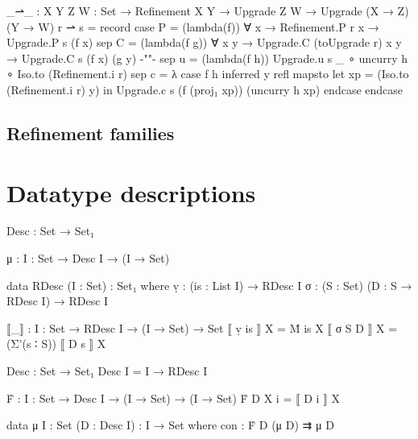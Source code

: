 \begin{code}
_⇀_ :  {X Y Z W : Set} →
       Refinement X Y → Upgrade Z W → Upgrade (X → Z) (Y → W)
r ⇀ s = record
  case   P  =  (lambda(f)) ∀ x → Refinement.P r x → Upgrade.P s (f x)
  sep    C  =  (lambda(f g)) ∀ x y  →  Upgrade.C (toUpgrade r)  x      y      →
                                       Upgrade.C s              (f x)  (g y)  {-""-}
  sep    u  =  (lambda(f h)) Upgrade.u s _ ∘ uncurry h ∘ Iso.to (Refinement.i r)
  sep    c  =  λ case f h inferred y refl mapsto  let  xp = (Iso.to (Refinement.i r) y)
                                                  in   Upgrade.c s (f (proj₁ xp)) (uncurry h xp) endcase endcase
\end{code}




\subsection{Refinement families}



\section{Datatype descriptions}

\begin{code}
Desc : Set → Set₁

μ : {I : Set} → Desc I → (I → Set)

data RDesc (I : Set) : Set₁ where
  ṿ  :  (is : List I) → RDesc I
  σ  :  (S : Set) (D : S → RDesc I) → RDesc I
  
⟦_⟧ : {I : Set} → RDesc I → (I → Set) → Set
⟦  ṿ is   ⟧  X  =  Ṁ is X
⟦  σ S D  ⟧  X  =  (Σ'(s ∶ S)) ⟦ D s ⟧ X

Desc : Set → Set₁
Desc I = I → RDesc I

Ḟ : {I : Set} → Desc I → (I → Set) → (I → Set)
Ḟ D X i = ⟦ D i ⟧ X

data μ {I : Set} (D : Desc I) : I → Set where
  con : Ḟ D (μ D) ⇉ μ D
\end{code}

